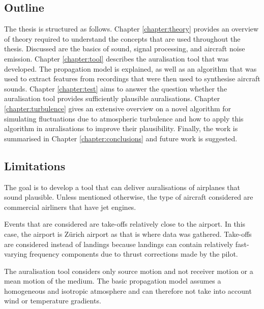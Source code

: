 \subsection{Outline}
The thesis is structured as follows.
\newline
\newline
Chapter \ref{chapter:theory} provides an overview of theory required to
understand the concepts that are used throughout the thesis. Discussed are the
basics of sound, signal processing, and aircraft noise emission.
\newline
\newline
Chapter \ref{chapter:tool} describes the auralisation tool that was developed.
The propagation model is explained, as well as an algorithm that was used to
extract features from recordings that were then used to synthesise aircraft sounds.
\newline
\newline
Chapter \ref{chapter:test} aims to answer the question whether the auralisation
tool provides sufficiently plausible auralisations.
\newline
\newline
Chapter \ref{chapter:turbulence} gives an extensive overview on a novel
algorithm for simulating fluctuations due to atmospheric turbulence and how to
apply this algorithm in auralisations to improve their plausibility.
\newline
\newline
Finally, the work is summarised in Chapter \ref{chapter:conclusions} and future
work is suggested.


\subsection{Limitations}
The goal is to develop a tool that can deliver auralisations of airplanes that
sound plausible. Unless mentioned otherwise, the type of aircraft considered are
commercial airliners that have jet engines.

Events that are considered are take-offs relatively close to the airport. In
this case, the airport is Z\"{u}rich airport as that is where data was gathered.
Take-offs are considered instead of landings because landings can contain
relatively fast-varying frequency components due to thrust corrections made by the pilot.

The auralisation tool considers only source motion and not receiver motion
or a mean motion of the medium. The basic propagation model assumes a homogeneous
and isotropic atmosphere and can therefore not take into account wind or
temperature gradients.

%


